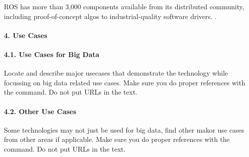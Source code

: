 \documentclass[9pt,twocolumn,twoside]{styles/osajnl}
\begin{document}


ROS has more than 3,000 components available from its distributed community, including proof-of-concept algos to industrial-quality software drivers. \cite{www-ros-about}.



\paragraph{4. Use Cases}

\paragraph{4.1. Use Cases  for Big Data}

Locate and describe major usecases that demonstrate the technology
while focussing on big data related use cases. Make sure you do proper
references with the \cite{?} command. Do not put URLs in the text.

\paragraph {4.2. Other Use Cases}

Some technologies may not just be used for big data, find other makor
use cases from other areas if applicable.  Make sure you do proper
references with the \cite{?} command. Do not put URLs in the text.
\end{document}
